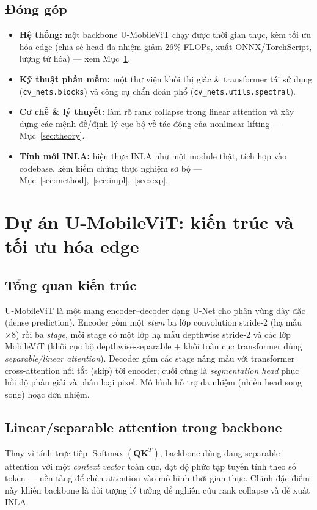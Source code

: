 \documentclass[12pt,a4paper]{article}
\begin{document}
\subsection{Đóng góp}
\begin{itemize}
    \item \textbf{Hệ thống:} một backbone U-MobileViT chạy được thời gian thực, kèm tối ưu hóa edge
    (chia sẻ head đa nhiệm giảm 26\% FLOPs, xuất ONNX/TorchScript, lượng tử hóa) --- xem
    Mục~\ref{sec:project}.
    \item \textbf{Kỹ thuật phần mềm:} một thư viện khối thị giác \& transformer tái sử dụng
    (\texttt{cv\_nets.blocks}) và công cụ chẩn đoán phổ (\texttt{cv\_nets.utils.spectral}).
    \item \textbf{Cơ chế \& lý thuyết:} làm rõ rank collapse trong linear attention và xây dựng các
    mệnh đề/định lý cục bộ về tác động của nonlinear lifting --- Mục~\ref{sec:theory}.
    \item \textbf{Tính mới INLA:} hiện thực INLA như một module thật, tích hợp vào codebase, kèm
    kiểm chứng thực nghiệm sơ bộ --- Mục~\ref{sec:method},~\ref{sec:impl},~\ref{sec:exp}.
\end{itemize}

\section{Dự án U-MobileViT: kiến trúc và tối ưu hóa edge}
\label{sec:project}

\subsection{Tổng quan kiến trúc}
U-MobileViT là một mạng encoder--decoder dạng U-Net cho phân vùng dày đặc (dense prediction).
Encoder gồm một \emph{stem} ba lớp convolution stride-2 (hạ mẫu $\times 8$) rồi ba \emph{stage},
mỗi stage có một lớp hạ mẫu depthwise stride-2 và các lớp MobileViT (khối cục bộ depthwise-separable
+ khối toàn cục transformer dùng \emph{separable/linear attention}). Decoder gồm các stage nâng mẫu
với transformer cross-attention nối tắt (skip) tới encoder; cuối cùng là \emph{segmentation head}
phục hồi độ phân giải và phân loại pixel. Mô hình hỗ trợ đa nhiệm (nhiều head song song) hoặc đơn
nhiệm.

\subsection{Linear/separable attention trong backbone}
Thay vì tính trực tiếp $\operatorname{Softmax}(\mathbf{Q}\mathbf{K}^T)$, backbone dùng dạng
separable attention với một \emph{context vector} toàn cục, đạt độ phức tạp tuyến tính theo số
token --- nền tảng để chèn attention vào mô hình thời gian thực. Chính đặc điểm này khiến backbone
là đối tượng lý tưởng để nghiên cứu rank collapse và đề xuất INLA.
\end{document}
